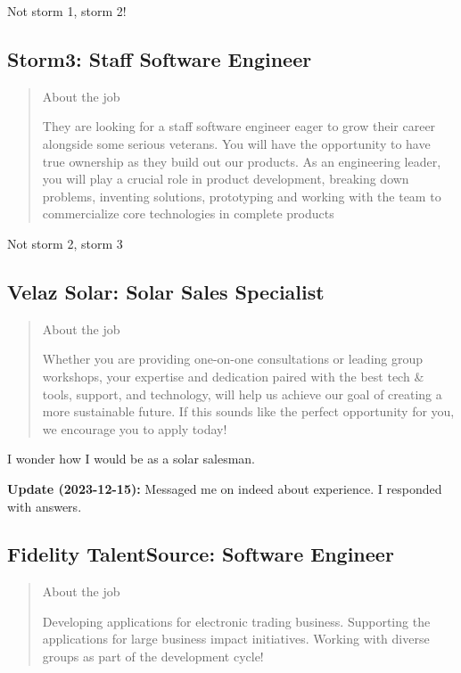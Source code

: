 \documentclass[
	letterpaper, %
	12pt, %
]{CSSullivanBusinessReport}
\begin{document}
Not storm 1, storm 2!


\subsection[Storm3]{Storm3: Staff Software Engineer}

\begin{quote}
	About the job
	
	They are looking for a staff software engineer eager to grow their career alongside some serious veterans. You will have the opportunity to have true ownership as they build out our products. As an engineering leader, you will play a crucial role in product development, breaking down problems, inventing solutions, prototyping and working with the team to commercialize core technologies in complete products

\end{quote}

Not storm 2, storm 3



\subsection[Velaz Solar]{Velaz Solar: Solar Sales Specialist}

\begin{quote}
	About the job
	
	Whether you are providing one-on-one consultations or leading group workshops, your expertise and dedication paired with the best tech \& tools, support, and technology, will help us achieve our goal of creating a more sustainable future. If this sounds like the perfect opportunity for you, we encourage you to apply today!

\end{quote}

I wonder how I would be as a solar salesman.

\textbf{Update (2023-12-15):} Messaged me on indeed about experience. I responded with answers. 


\subsection[Fidelity TalentSource]{Fidelity TalentSource: Software Engineer}

\begin{quote}
	About the job
	
	Developing applications for electronic trading business. Supporting the applications for large business impact initiatives. Working with diverse groups as part of the development cycle!

\end{quote}
\end{document}

